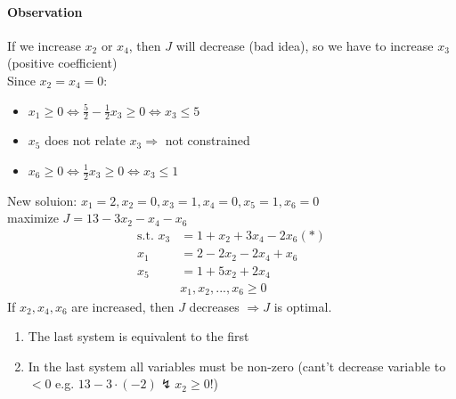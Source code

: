 \paragraph{Observation} If we increase $x_2$ or $x_4$, then $J$ will decrease (bad idea), so we have to increase $x_3$ (positive coefficient) \\
Since $x_2=x_4 = 0$: \\
\begin{itemize}
	\item $x_1 \geq 0 \Leftrightarrow \frac{5}{2}-\frac{1}{2}x_3 \geq 0 \Leftrightarrow x_3 \leq 5$
	\item $x_5$ does not relate $x_3 \Rightarrow$ not constrained
	\item $x_6 \geq 0 \Leftrightarrow \frac{1}{2}x_3 \geq 0 \Leftrightarrow x_3 \leq 1$
\end{itemize}
New soluion: $x_1 = 2, x_2 = 0, x_3 = 1, x_4 = 0, x_5 = 1, x_6 = 0$ \\
maximize $J = 13 - 3x_2 - x_4 - x_6$ \\
\begin{align*}
\text{s.t. } x_3 &= 1 + x_2 + 3x_4 - 2x_6 (*) \\
x_1 &= 2 - 2x_2 - 2x_4 + x_6 \\
x_5 &= 1 + 5x_2 + 2x_4 \\
&x_1,x_2,...,x_6 \geq 0
\end{align*}
If $x_2,x_4,x_6$ are increased, then $J$ decreases $\Rightarrow J$ is optimal. 
\begin{enumerate}
	\item The last system is equivalent to the first
	\item In the last system all variables must be non-zero (cant't decrease variable to $<0$ e.g. $13-3\cdot(-2) \lightning x_2 \geq 0$!)
\end{enumerate}	

